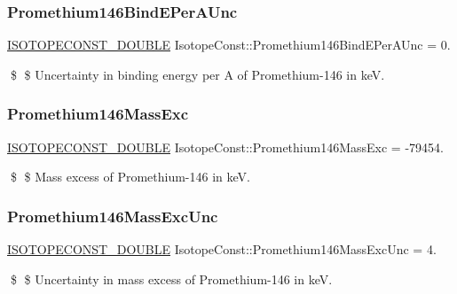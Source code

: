 \subsubsection{\texorpdfstring{Promethium146\+Bind\+E\+Per\+A\+Unc}{Promethium146BindEPerAUnc}}
{\footnotesize\ttfamily \mbox{\hyperlink{group___isotope_const-_macros_ga8f45a7272ce02c0b4c65c44636ed719a}{I\+S\+O\+T\+O\+P\+E\+C\+O\+N\+S\+T\+\_\+\+D\+O\+U\+B\+LE}} Isotope\+Const\+::\+Promethium146\+Bind\+E\+Per\+A\+Unc = 0.}

\$ \$ Uncertainty in binding energy per A of Promethium-\/146 in keV. \mbox{\label{group___isotope_const-_promethium-_pm146_ga20130667413a0a6ec263c42a462120ea}} 
\subsubsection{\texorpdfstring{Promethium146\+Mass\+Exc}{Promethium146MassExc}}
{\footnotesize\ttfamily \mbox{\hyperlink{group___isotope_const-_macros_ga8f45a7272ce02c0b4c65c44636ed719a}{I\+S\+O\+T\+O\+P\+E\+C\+O\+N\+S\+T\+\_\+\+D\+O\+U\+B\+LE}} Isotope\+Const\+::\+Promethium146\+Mass\+Exc = -\/79454.}

\$ \$ Mass excess of Promethium-\/146 in keV. \mbox{\label{group___isotope_const-_promethium-_pm146_ga43675682584b013d988e895f6edfb1a1}} 
\subsubsection{\texorpdfstring{Promethium146\+Mass\+Exc\+Unc}{Promethium146MassExcUnc}}
{\footnotesize\ttfamily \mbox{\hyperlink{group___isotope_const-_macros_ga8f45a7272ce02c0b4c65c44636ed719a}{I\+S\+O\+T\+O\+P\+E\+C\+O\+N\+S\+T\+\_\+\+D\+O\+U\+B\+LE}} Isotope\+Const\+::\+Promethium146\+Mass\+Exc\+Unc = 4.}

\$ \$ Uncertainty in mass excess of Promethium-\/146 in keV. \mbox{\label{group___isotope_const-_promethium-_pm146_gadfbf6395095453b8a0f0511e3bfc8335}} 

